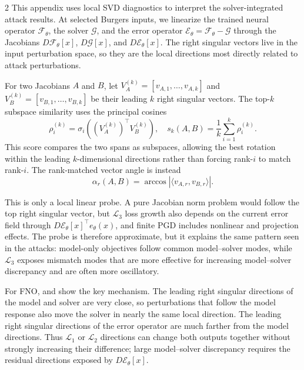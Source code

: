 \begin{multicols}{2}
This appendix uses local SVD diagnostics to interpret the solver-integrated
attack results. At selected Burgers inputs, we linearize the trained neural
operator $\mathcal{F}_\theta$, the solver $\mathcal{G}$, and the error operator
$\mathcal{E}_\theta=\mathcal{F}_\theta-\mathcal{G}$ through the Jacobians
$D\mathcal{F}_\theta[x]$, $D\mathcal{G}[x]$, and
$D\mathcal{E}_\theta[x]$. The right singular vectors live in the input
perturbation space, so they are the local directions most directly related to
attack perturbations.

For two Jacobians $A$ and $B$, let
$V_A^{(k)}=[v_{A,1},\ldots,v_{A,k}]$ and
$V_B^{(k)}=[v_{B,1},\ldots,v_{B,k}]$ be their leading $k$ right singular
vectors. The top-$k$ subspace similarity uses the principal cosines
\begin{equation*}
  \rho_i^{(k)}
  =
  \sigma_i\!\left((V_A^{(k)})^\top V_B^{(k)}\right),
  \quad
  s_k(A,B)=\frac{1}{k}\sum_{i=1}^k \rho_i^{(k)} .
\end{equation*}
This score compares the two spans as subspaces, allowing the best rotation
within the leading $k$-dimensional directions rather than forcing rank-$i$ to
match rank-$i$. The rank-matched vector angle is instead
\begin{equation*}
  \alpha_r(A,B)
  =
  \arccos |\langle v_{A,r},v_{B,r}\rangle| .
\end{equation*}

This is only a local linear probe. A pure Jacobian norm problem would
follow the top right singular vector, but $\mathcal{L}_3$ loss growth also
depends on the current error field through
$D\mathcal{E}_\theta[x]^\top e_\theta(x)$, and finite PGD includes nonlinear
and projection effects. The probe is therefore approximate, but it explains
the same pattern seen in the attacks: model-only objectives follow common
model--solver modes, while $\mathcal{L}_3$ exposes mismatch modes that are more
effective for increasing model--solver discrepancy and are often more
oscillatory.

For FNO,  and
 show the key mechanism. The leading right
singular directions of the model and solver are very close, so perturbations
that follow the model response also move the solver in nearly the same local
direction. The leading right singular directions of the error operator are
much farther from the model directions. Thus $\mathcal{L}_1$ or $\mathcal{L}_2$ directions
can change both outputs together without strongly increasing their difference;
large model--solver discrepancy requires the residual directions exposed by
$D\mathcal{E}_\theta[x]$.
\end{multicols}

